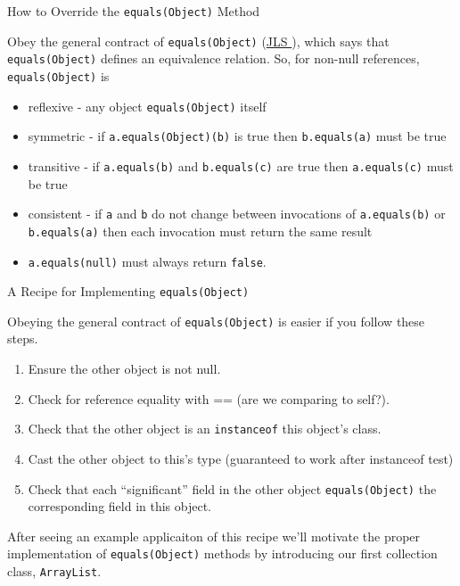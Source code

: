 \documentclass{beamer}
\begin{document}
\begin{frame}[fragile]{How to Override the {\tt equals(Object)} Method}


Obey the general contract of {\tt equals(Object)} (\href{}{JLS }), which says that {\tt equals(Object)} defines an equivalence relation.  So, for non-null references, {\tt equals(Object)} is
\begin{itemize}
\item reflexive - any object {\tt equals(Object)} itself
\item symmetric - if {\tt a.equals(Object)(b)} is true then {\tt b.equals(a)} must be true
\item transitive - if {\tt a.equals(b)} and {\tt b.equals(c)} are true then {\tt a.equals(c)} must be true
\item consistent - if {\tt a} and {\tt b} do not change between invocations of {\tt a.equals(b)} or {\tt b.equals(a)} then each invocation must return the same result
\item {\tt a.equals(null)} must always return {\tt false}.
\end{itemize}


\end{frame}


\begin{frame}[fragile]{A Recipe for Implementing {\tt equals(Object)}}


Obeying the general contract of {\tt equals(Object)} is easier if you follow these steps.\\

\begin{enumerate}
\item Ensure the other object is not null.
\item Check for reference equality with == (are we comparing to self?).
\item Check that the other object is an {\tt instanceof} this object's class.
\item Cast the other object to this's type (guaranteed to work after instanceof test)
\item Check that each ``significant'' field in the other object {\tt equals(Object)} the corresponding field in this object.
\end{enumerate}

After seeing an example applicaiton of this recipe we'll motivate the proper implementation of {\tt equals(Object)} methods by introducing our first collection class, {\tt ArrayList}.

\end{frame}
\end{document}
